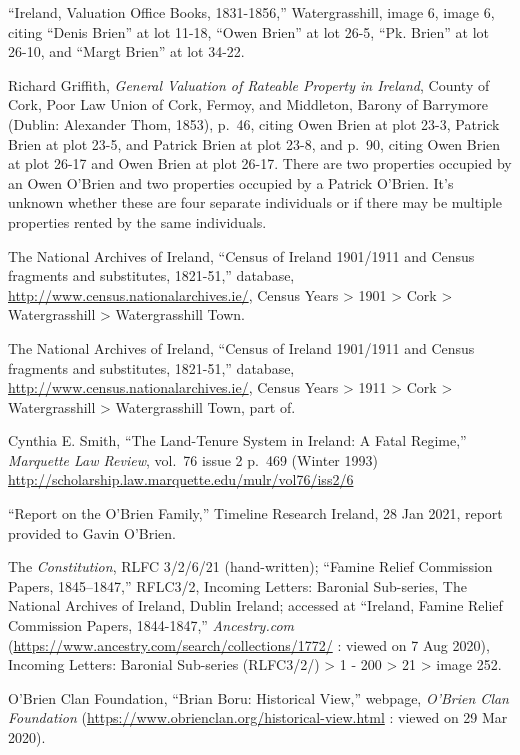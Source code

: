 \begin{thebibliography}{999}
``Ireland, Valuation Office Books, 1831-1856,'' Watergrasshill, image 6, image 6, citing ``Denis Brien'' at lot 11-18, ``Owen Brien'' at lot 26-5, ``Pk. Brien'' at lot 26-10, and ``Margt Brien'' at lot 34-22.

Richard Griffith, \textit{General Valuation of Rateable Property in Ireland}, County of Cork, Poor Law Union of Cork, Fermoy, and Middleton, Barony of Barrymore (Dublin: Alexander Thom, 1853), p.\ 46, citing Owen Brien at plot 23-3, Patrick Brien at plot 23-5, and Patrick Brien at plot 23-8, and p.\ 90, citing Owen Brien at plot 26-17 and Owen Brien at plot 26-17. There are two properties occupied by an Owen O'Brien and two properties occupied by a Patrick O'Brien. It's unknown whether these are four separate individuals or if there may be multiple properties rented by the same individuals.

The National Archives of Ireland, ``Census of Ireland 1901/1911 and Census fragments and substitutes, 1821-51,'' database, \url{http://www.census.nationalarchives.ie/}, Census Years > 1901 > Cork > Watergrasshill > Watergrasshill Town.

The National Archives of Ireland, ``Census of Ireland 1901/1911 and Census fragments and substitutes, 1821-51,'' database, \url{http://www.census.nationalarchives.ie/}, Census Years > 1911 > Cork > Watergrasshill > Watergrasshill Town, part of.

Cynthia E. Smith, ``The Land-Tenure System in Ireland: A Fatal Regime,'' \textit{Marquette Law Review}, vol.\ 76 issue 2 p.\ 469 (Winter 1993) \url{http://scholarship.law.marquette.edu/mulr/vol76/iss2/6}

``Report on the O'Brien Family,'' Timeline Research Ireland, 28 Jan 2021, report provided to Gavin O'Brien.

 The \textit{Constitution}, RLFC 3/2/6/21 (hand-written); ``Famine Relief Commission Papers, 1845–1847,'' RFLC3/2, Incoming Letters: Baronial Sub-series, The National Archives of Ireland, Dublin Ireland; accessed at ``Ireland, Famine Relief Commission Papers, 1844-1847,'' \textit{Ancestry.com} (\url{https://www.ancestry.com/search/collections/1772/} : viewed on 7 Aug 2020), Incoming Letters: Baronial Sub-series (RLFC3/2/) > 1 - 200 > 21 > image 252.


O'Brien Clan Foundation, ``Brian Boru: Historical View,'' webpage, \textit{O'Brien Clan Foundation} (\url{https://www.obrienclan.org/historical-view.html} : viewed on 29 Mar 2020).


\end{thebibliography}
